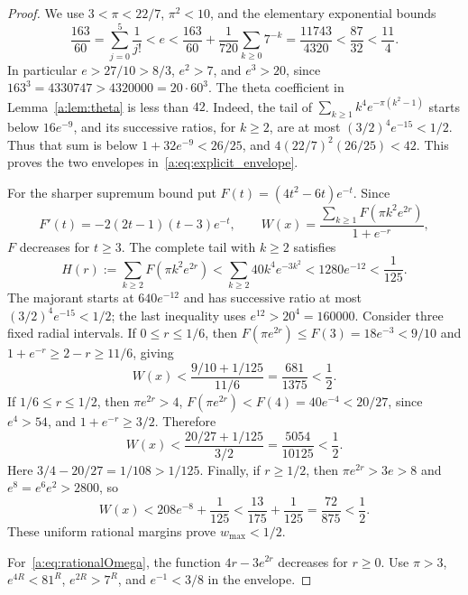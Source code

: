 \documentclass[11pt,a4paper]{article}
\numberwithin{equation}{section}
\theoremstyle{definition}\newtheorem{definition}[theorem]{Definition}
\theoremstyle{remark}\newtheorem{remark}[theorem]{Remark}
\begin{document}
\begin{proof}
We use $3<\pi<22/7$, $\pi^2<10$, and the elementary exponential bounds
\begin{equation}\label{a:eq:elementarye}
 \frac{163}{60}=\sum_{j=0}^5\frac1{j!}<e
 <\frac{163}{60}+\frac1{720}\sum_{k\ge0}7^{-k}
 =\frac{11743}{4320}<\frac{87}{32}<\frac{11}{4}.
\end{equation}
In particular $e>27/10>8/3$, $e^2>7$, and $e^3>20$, since
$163^3=4330747>4320000=20\cdot60^3$.
The theta coefficient in Lemma~\ref{a:lem:theta} is less than $42$. Indeed, the tail of
$\sum_{k\ge1}k^4e^{-\pi(k^2-1)}$ starts below $16e^{-9}$, and its successive ratios, for $k\ge2$, are at most
$(3/2)^4e^{-15}<1/2$. Thus that sum is below
$1+32e^{-9}<26/25$, and
$4(22/7)^2(26/25)<42$.
This proves the two envelopes in~\eqref{a:eq:explicit_envelope}.

For the sharper supremum bound put $F(t)=(4t^2-6t)e^{-t}$. Since
\[
 F'(t)=-2(2t-1)(t-3)e^{-t},\qquad
 W(x)=\frac{\sum_{k\ge1}F(\pi k^2e^{2r})}{1+e^{-r}},
\]
$F$ decreases for $t\ge3$. The complete tail with $k\ge2$ satisfies
\[
 H(r):=\sum_{k\ge2}F(\pi k^2e^{2r})
 <\sum_{k\ge2}40k^4e^{-3k^2}<1280e^{-12}<\frac1{125}.
\]
The majorant starts at $640e^{-12}$ and has successive ratio at most
$(3/2)^4e^{-15}<1/2$; the last inequality uses $e^{12}>20^4=160000$.
Consider three fixed radial intervals. If $0\le r\le1/6$, then
$F(\pi e^{2r})\le F(3)=18e^{-3}<9/10$ and
$1+e^{-r}\ge2-r\ge11/6$, giving
\[
 W(x)<\frac{9/10+1/125}{11/6}=\frac{681}{1375}<\frac12.
\]
If $1/6\le r\le1/2$, then $\pi e^{2r}>4$,
$F(\pi e^{2r})<F(4)=40e^{-4}<20/27$, since $e^4>54$,
and $1+e^{-r}\ge3/2$. Therefore
\[
 W(x)<\frac{20/27+1/125}{3/2}=\frac{5054}{10125}<\frac12.
\]
Here $3/4-20/27=1/108>1/125$. Finally, if $r\ge1/2$, then
$\pi e^{2r}>3e>8$ and $e^8=e^6e^2>2800$, so
\[
 W(x)<208e^{-8}+\frac1{125}
 <\frac{13}{175}+\frac1{125}=\frac{72}{875}<\frac12.
\]
These uniform rational margins prove $w_{\max}<1/2$.

For~\eqref{a:eq:rationalOmega}, the function $4r-3e^{2r}$ decreases for $r\ge0$. Use $\pi>3$, $e^{4R}<81^R$, $e^{2R}>7^R$, and $e^{-1}<3/8$ in the envelope.
\end{proof}
\end{document}
